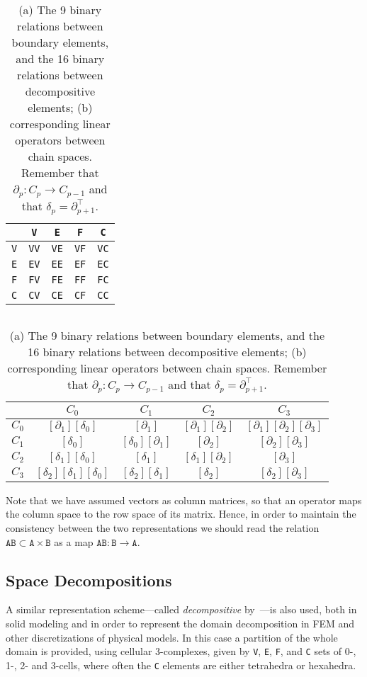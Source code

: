 \begin{table}[htp]
\caption{(a) The 9 binary relations between boundary elements, and the 16 binary relations between decompositive elements; (b) corresponding linear operators between chain spaces. Remember that $\partial_p: C_p\to C_{p-1}$ and that $\delta_p = \partial_{p+1}^\top$. }
\begin{center}
\begin{tabular}{|c|ccc|c|}
\hline
 &\texttt{V} & \texttt{E} & \texttt{F} & \texttt{C} \\ 
\hline
\texttt{V} &\texttt{VV} & \texttt{VE} & \texttt{VF} & \texttt{VC} \\ 
\texttt{E} &\texttt{EV} & \texttt{EE} & \texttt{EF} & \texttt{EC} \\ 
\texttt{F} &\texttt{FV} & \texttt{FE} & \texttt{FF} & \texttt{FC} \\ 
\hline
\texttt{C} &\texttt{CV} & \texttt{CE} & \texttt{CF} & \texttt{CC} \\ 
\hline
\end{tabular}
$\qquad$
\begin{tabular}{|c|ccc|c|}
\hline
 &\texttt{$C_0$} & \texttt{$C_1$} & \texttt{$C_2$} & \texttt{$C_3$} \\ 
\hline
\texttt{$C_0$} & $[\partial_1][\delta_0]$ & $[\partial_1]$ & $[\partial_1][\partial_2]$ & $[\partial_1][\partial_2][\partial_3]$\\ 
\texttt{$C_1$} & $[\delta_0]$  & $[\delta_0][\partial_1]$ & $[\partial_2]$ & $[\partial_2][\partial_3]$ \\ 
\texttt{$C_2$} & $[\delta_1][\delta_0]$ & $[\delta_1]$ & $[\delta_1][\partial_2]$ & $[\partial_3]$ \\ 
\hline
\texttt{$C_3$} & $[\delta_2][\delta_1][\delta_0]$ & $[\delta_2][\delta_1]$ & $[\delta_2]$ & $[\delta_2][\partial_3]$ \\ 
\hline
\end{tabular}
\end{center}
\label{tab:relations}
\end{table}%


Note that we have assumed vectors as column matrices, so that an operator maps the column space to the row space of its matrix. Hence, in order to maintain the consistency between the two representations  we should read the relation $\texttt{AB} \subset \texttt{A}\times \texttt{B}$ as a map $\texttt{AB}: \texttt{B} \to \texttt{A}$.


\subsection{Space Decompositions}\label{space-decompositions}
A similar representation scheme---called \emph{decompositive} by~\cite{Requicha:1980:RRS:356827.356833}---is also  used, both in solid modeling and in order to represent the domain decomposition in FEM and other discretizations of physical models. In this case a partition of the whole domain is provided, using cellular 3-complexes, given by \texttt{V}, \texttt{E}, \texttt{F}, and \texttt{C} sets of $0$-, 1-, 2- and 3-cells, where often the \texttt{C} elements  are either tetrahedra or hexahedra.  

